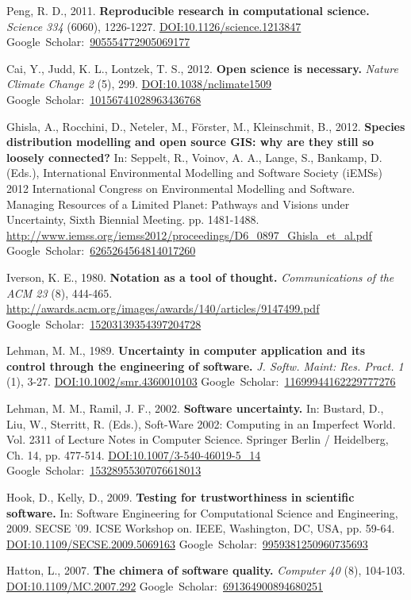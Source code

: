 \documentclass[a4paper,11pt]{article}
\newcommand{\gourl}[1]{\url{#1}}
\newcommand{\goDOI}[1]{\href{http://dx.doi.org/#1}{DOI:#1}}
\newcommand{\goScholar}[1]{{Google~Scholar}:~\href{http://scholar.google.com/scholar?cluster=#1}{#1}}
\begin{document}
\begin{footnotesize}
{\begin{thebibliography}{}
 Peng, R. D., 2011. \textbf{Reproducible research in computational science.} \emph{Science 334} (6060), 1226-1227. \goDOI{10.1126/science.1213847} \goScholar{905554772905069177}

 Cai, Y., Judd, K. L., Lontzek, T. S., 2012. \textbf{Open science is necessary.} \emph{Nature Climate Change 2} (5), 299. \goDOI{10.1038/nclimate1509} \goScholar{10156741028963436768}

 Ghisla, A., Rocchini, D., Neteler, M., F\"orster, M., Kleinschmit, B., 2012. \textbf{Species distribution modelling and open source GIS: why are they still so loosely connected?} In: Seppelt, R., Voinov, A. A., Lange, S., Bankamp, D. (Eds.), International Environmental Modelling and Software Society (iEMSs) 2012 International Congress on Environmental Modelling and Software. Managing Resources of a Limited Planet: Pathways and Visions under Uncertainty, Sixth Biennial Meeting. pp. 1481-1488. \gourl {http://www.iemss.org/iemss2012/proceedings/D6\_0897\_Ghisla\_et\_al.pdf} \goScholar{6265264564814017260}

 Iverson, K. E., 1980. \textbf{Notation as a tool of thought.} \emph{Communications of the ACM 23} (8), 444-465. \gourl {http://awards.acm.org/images/awards/140/articles/9147499.pdf} \goScholar{15203139354397204728}

 Lehman, M. M., 1989. \textbf{Uncertainty in computer application and its control through the engineering of software.} \emph{J. Softw. Maint: Res. Pract. 1} (1), 3-27. \goDOI{10.1002/smr.4360010103} \goScholar{11699944162229777276}

 Lehman, M. M., Ramil, J. F., 2002. \textbf{Software uncertainty.} In: Bustard, D., Liu, W., Sterritt, R. (Eds.), Soft-Ware 2002: Computing in an Imperfect World. Vol. 2311 of Lecture Notes in Computer Science. Springer Berlin / Heidelberg, Ch. 14, pp. 477-514. \goDOI{10.1007/3-540-46019-5\_14} \goScholar{15328955307076618013}

 Hook, D., Kelly, D., 2009. \textbf{Testing for trustworthiness in scientific software.} In: Software Engineering for Computational Science and Engineering, 2009. SECSE '09. ICSE Workshop on. IEEE, Washington, DC, USA, pp. 59-64. \goDOI{10.1109/SECSE.2009.5069163} \goScholar{9959381250960735693}

 Hatton, L., 2007. \textbf{The chimera of software quality.} \emph{Computer 40} (8), 104-103. \goDOI{10.1109/MC.2007.292} \goScholar{691364900894680251}


\end{thebibliography}}
\end{footnotesize}
\end{document}
